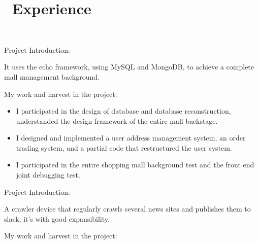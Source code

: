 \documentclass{resume}
\begin{document}
\section{\faUsers\ Experience} \vspace{1mm}

\faLink\ 

\vspace{1mm}\par
\noindent
Project Introduction:

\vspace{1mm}\par
\setlength{\parindent}{2ex}
It uses the echo framework, using MySQL and MongoDB, to achieve a complete mall management background.

\vspace{1mm}\par
\noindent
My work and harvest in the project:

\begin{itemize}[parsep=1ex]
	\item I participated in the design of database and database reconstruction, understanded the design framework of the entire mall backstage.
	\item I designed and implemented a user address management system, an order trading system, and a partial code that restructured the user system.
	\item I participated in the entire shopping mall background test and the front end joint debugging test.
\end{itemize}


\vspace{1mm}\par
\noindent
Project Introduction:

\vspace{1mm}\par
\setlength{\parindent}{2ex}
A crawler device that regularly crawls several news sites and publishes them to slack, it's with good expansibility.

\vspace{1mm}\par
\noindent
My work and harvest in the project:
\end{document}
